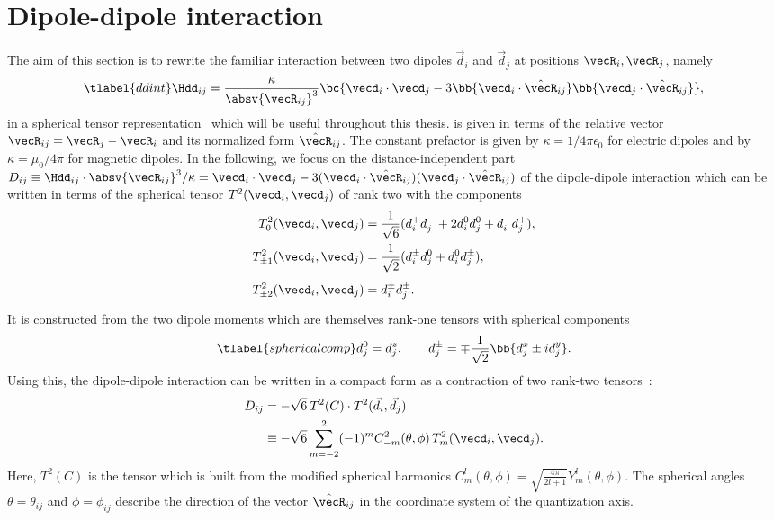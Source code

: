 \section{Dipole-dipole interaction}
The aim of this section is to rewrite the familiar interaction between two dipoles $\vec{d}_i$ and $\vec{d}_j$ at positions $\vecR_i, \vecR_j$, namely
\begin{align} \tlabel{ddint}
\Hdd_{ij} = \frac{\kappa}{\absv{\vecR_{ij}}^3} \bc{ \vecd_i \cdot \vecd_j -3 \bb{ \vecd_i \cdot \hat{\vecR}_{ij} }\bb{ \vecd_j \cdot \hat{\vecR}_{ij} } },
\end{align}
in a spherical tensor representation~\cite{Micheli2007,Gorshkov2011c} which will be useful throughout this thesis.
 is given in terms of the relative vector $\vecR_{ij} = \vecR_j - \vecR_i$ and its normalized form $\hat{\vecR}_{ij}$.
The constant prefactor is given by $\kappa = 1/4\pi\epsilon_0$ for electric dipoles and by
$\kappa = \mu_0 / 4\pi$ for magnetic dipoles.
In the following, we focus on the distance-independent part $D_{ij} \equiv \Hdd_{ij} \cdot \absv{\vecR_{ij}}^3/\kappa=\vecd_i \cdot \vecd_j -3 (\vecd_i \cdot \hat{\vecR}_{ij})(\vecd_j \cdot \hat{\vecR}_{ij})$ of the dipole-dipole interaction which can be written in terms of the spherical tensor $T^2(\vecd_i, \vecd_j)$ of rank two with the components
\begin{align}
T^2_0(\vecd_i, \vecd_j) &= \frac{1}{\sqrt{6}} (d_i^+ d_j^- + 2d_i^0 d_j^0 + d_i^{-} d_j^{+}), \\
T^2_{\pm 1}(\vecd_i, \vecd_j) &= \frac{1}{\sqrt{2}} (d_i^{\pm} d_j^0 + d_i^0 d_j^{\pm}), \\
T^2_{\pm 2}(\vecd_i, \vecd_j) &= d_i^{\pm} d_j^{\pm} \vphantom{\frac{1}{42}}.
\end{align}
It is constructed from the two dipole moments which are themselves rank-one tensors with spherical components
\begin{align} \tlabel{sphericalcomp}
d^0_j = d^z_j, \qquad d_j^\pm = \mp\frac{1}{\sqrt{2}}\bb{d_j^x\pm i d_j^y}.
\end{align}
Using this, the dipole-dipole interaction can be written in a compact form as a contraction of two rank-two tensors~\cite{Brown2003}:
\begin{align}
    D_{ij} &= -\sqrt{6} \: T^2(C)\cdot T^2(\vec{d}_i,\vec{d}_j)\\
           &\equiv -\sqrt{6}  \sum_{m=-2}^{2} (-1)^m C^2_{-m}(\theta,\phi) \, T^2_m(\vecd_i,\vecd_j).
\end{align}
Here, $T^2(C)$ is the tensor which is built from the modified spherical harmonics $C^l_m(\theta,\phi)=\sqrt{\frac{4\pi}{2l+1}} Y^l_m(\theta,\phi)$. The spherical angles $\theta = \theta_{ij}$ and $\phi = \phi_{ij}$ describe the direction of the vector $\hat{\vecR}_{ij}$ in the coordinate system of the quantization axis.
